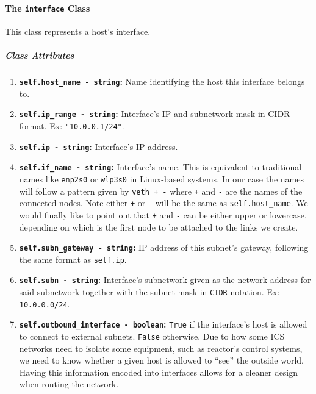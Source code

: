                 \paragraph{The \texttt{interface} Class}
                    This class represents a host's interface.

                    \subparagraph{Class Attributes}
                        \begin{enumerate}
                            \item \textbf{\texttt{self.host\_name - string}:} Name identifying the host this interface belongs to.
                            \item \textbf{\texttt{self.ip\_range - string}:} Interface's IP and subnetwork mask in \href{https://en.wikipedia.org/wiki/Classless_Inter-Domain_Routing}{CIDR} format. Ex: \texttt{"10.0.0.1/24"}.
                            \item \textbf{\texttt{self.ip - string}:} Interface's IP address.
                            \item \textbf{\texttt{self.if\_name - string}:} Interface's name. This is equivalent to traditional names like \texttt{enp2s0} or \texttt{wlp3s0} in Linux-based systems. In our case the names will follow a pattern given by \texttt{veth\_+\_-} where \texttt{+} and \texttt{-} are the names of the connected nodes. Note either \texttt{+} or \texttt{-} will be the same as \texttt{self.host\_name}. We would finally like to point out that \texttt{+} and \texttt{-} can be either upper or lowercase, depending on which is the first node to be attached to the links we create.
                            \item \textbf{\texttt{self.subn\_gateway - string}:} IP address of this subnet's gateway, following the same format as \texttt{self.ip}.
                            \item \textbf{\texttt{self.subn - string}:} Interface's subnetwork given as the network address for said subnetwork together with the subnet mask in \texttt{CIDR} notation. Ex: \texttt{10.0.0.0/24}.
                            \item \textbf{\texttt{self.outbound\_interface - boolean}:} \texttt{True} if the interface's host is allowed to connect to external subnets. \texttt{False} otherwise. Due to how some ICS networks need to isolate some equipment, such as reactor's control systems, we need to know whether a given host is allowed to ``see'' the outside world. Having this information encoded into interfaces allows for a cleaner design when routing the network.
                        \end{enumerate}

